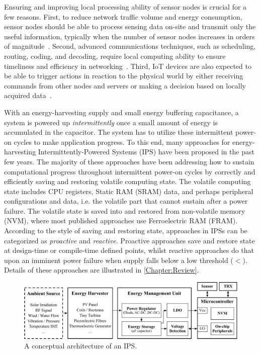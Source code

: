Ensuring and improving local processing ability of sensor nodes is crucial for a few reasons. First, to reduce network traffic volume and energy consumption, sensor nodes should be able to process sensing data on-site and transmit only the useful information, typically when the number of sensor nodes increases in orders of magnitude~\cite{shi2016edge}. Second, advanced communications techniques, such as scheduling, routing, coding, and decoding, require local computing ability to ensure timeliness and efficiency in networking~\cite{akyildiz2002wireless}. Third, IoT devices are also expected to be able to trigger actions in reaction to the physical world by either receiving commands from other nodes and servers or making a decision based on locally acquired data~\cite{miorandi2012internet}. 


With an energy-harvesting supply and small energy buffering capacitance, a system is powered up \textit{intermittently} once a small amount of energy is accumulated in the capacitor. 
The system has to utilize these intermittent power-on cycles to make application progress. 
To this end, many approaches for energy-harvesting Intermittently-Powered Systems (IPS) have been proposed in the past few years. 
The majority of these approaches have been addressing how to sustain computational progress throughout intermittent power-on cycles by correctly and efficiently saving and restoring volatile computing state. 
The volatile computing state includes CPU registers, Static RAM (SRAM) data, and perhaps peripheral configurations and data, i.e. the volatile part that cannot sustain after a power failure. 
The volatile state is saved into and restored from non-volatile memory (NVM), where most published approaches use Ferroelectric RAM (FRAM). 
According to the style of saving and restoring state, approaches in IPSs can be categorized as \textit{proactive} and \textit{reactive}. 
Proactive approaches save and restore state at design-time or compile-time defined points, whilst reactive approaches do that upon an imminent power failure when supply falls below a low threshold ($<$). 
Details of these approaches are illustrated in \cref{Chapter:Review}.

\begin{figure}[!htb]
  \centering
  \includegraphics[width=\columnwidth]{ch1_intro/figures/IPSarch}
  \caption{A conceptual architecture of an IPS.}
  \label{fig:ips_arch}
\end{figure}

